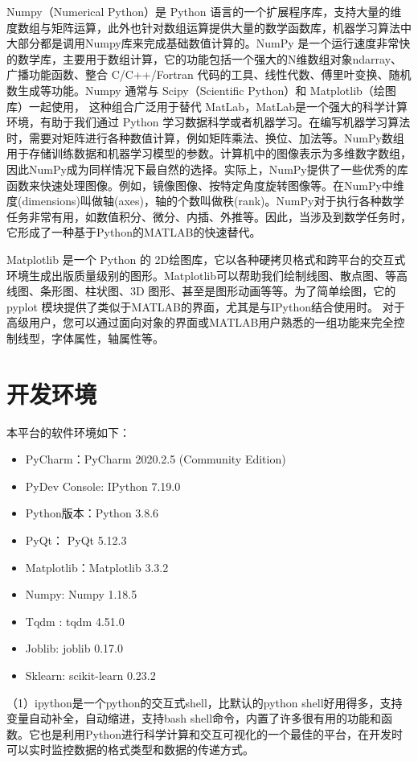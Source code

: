 \documentclass[cn,11pt,chinese]{elegantbook}
\begin{document}
Numpy（Numerical Python）是 Python 语言的一个扩展程序库，支持大量的维度数组与矩阵运算，此外也针对数组运算提供大量的数学函数库，机器学习算法中大部分都是调用Numpy库来完成基础数值计算的。NumPy 是一个运行速度非常快的数学库，主要用于数组计算，它的功能包括一个强大的N维数组对象ndarray、广播功能函数、整合 C/C++/Fortran 代码的工具、线性代数、傅里叶变换、随机数生成等功能。Numpy 通常与 Scipy（Scientific Python）和 Matplotlib（绘图库）一起使用， 这种组合广泛用于替代 MatLab，MatLab是一个强大的科学计算环境，有助于我们通过 Python 学习数据科学或者机器学习。在编写机器学习算法时，需要对矩阵进行各种数值计算，例如矩阵乘法、换位、加法等。NumPy数组用于存储训练数据和机器学习模型的参数。计算机中的图像表示为多维数字数组，因此NumPy成为同样情况下最自然的选择。实际上，NumPy提供了一些优秀的库函数来快速处理图像。例如，镜像图像、按特定角度旋转图像等。在NumPy中维度(dimensions)叫做轴(axes)，轴的个数叫做秩(rank)。NumPy对于执行各种数学任务非常有用，如数值积分、微分、内插、外推等。因此，当涉及到数学任务时，它形成了一种基于Python的MATLAB的快速替代。

Matplotlib 是一个 Python 的 2D绘图库，它以各种硬拷贝格式和跨平台的交互式环境生成出版质量级别的图形。Matplotlib可以帮助我们绘制线图、散点图、等高线图、条形图、柱状图、3D 图形、甚至是图形动画等等。为了简单绘图，它的 pyplot 模块提供了类似于MATLAB的界面，尤其是与IPython结合使用时。 对于高级用户，您可以通过面向对象的界面或MATLAB用户熟悉的一组功能来完全控制线型，字体属性，轴属性等。

\section{开发环境}

本平台的软件环境如下：

\begin{itemize}
	\item PyCharm：PyCharm 2020.2.5 (Community Edition)
	\item PyDev Console: IPython 7.19.0
	\item Python版本：Python 3.8.6
	\item PyQt： PyQt 5.12.3
	\item Matplotlib：Matplotlib 3.3.2
	\item Numpy: Numpy 1.18.5
	\item Tqdm : tqdm 4.51.0
	\item Joblib: joblib 0.17.0
	\item Sklearn: scikit-learn 0.23.2
\end{itemize}

（1）ipython是一个python的交互式shell，比默认的python shell好用得多，支持变量自动补全，自动缩进，支持bash shell命令，内置了许多很有用的功能和函数。它也是利用Python进行科学计算和交互可视化的一个最佳的平台，在开发时可以实时监控数据的格式类型和数据的传递方式。
\end{document}

